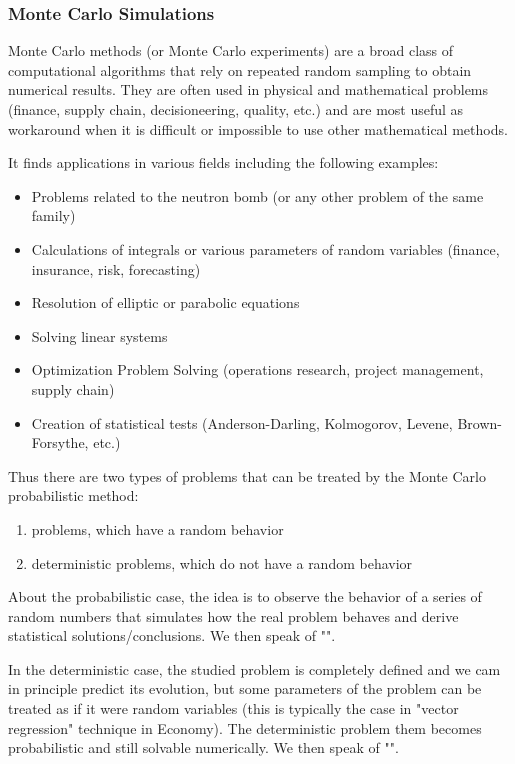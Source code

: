 	\subsubsection{Monte Carlo Simulations}
	Monte Carlo methods (or Monte Carlo experiments) are a broad class of computational algorithms that rely on repeated random sampling to obtain numerical results. They are often used in physical and mathematical problems (finance, supply chain, decisioneering, quality, etc.) and are most useful as workaround when it is difficult or impossible to use other mathematical methods.
	
	It finds applications in various fields including the following examples:
	\begin{itemize}
		\item Problems related to the neutron bomb (or any other problem of  the same family)

		\item Calculations of integrals or various parameters of random variables (finance, insurance, risk, forecasting)
	
		\item Resolution of elliptic or parabolic equations

		\item Solving linear systems

		\item Optimization Problem Solving (operations research, project management, supply chain)

		\item Creation of statistical tests (Anderson-Darling, Kolmogorov, Levene, Brown-Forsythe, etc.)
	\end{itemize}
	Thus there are two types of problems that can be treated by the Monte Carlo probabilistic method:
	\begin{enumerate}
		\item  problems, which have a random behavior 

		\item deterministic problems, which do not have a random behavior
	\end{enumerate}
	
	About the probabilistic case, the idea is to observe the behavior of a series of random numbers that simulates how the real problem behaves and derive statistical solutions/conclusions. We then speak of "".

	In the deterministic case, the studied problem is completely defined and we cam in principle predict its evolution, but some parameters of the problem can be treated as if it were random variables (this is typically the case in "vector regression" technique in Economy). The deterministic problem them becomes probabilistic and still solvable numerically. We then speak of "".
	

